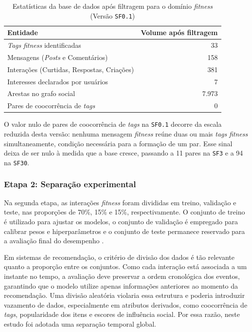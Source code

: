 \documentclass[a4paper,12pt]{article}
\begin{document}
{\begin{table}[H]
\centering
\caption{Estatísticas da base de dados após filtragem para o domínio \textit{fitness} (Versão \texttt{SF0.1})}
\label{tab:estatisticas_extracao}
\small
\begin{tabular}{|l|r|}
\hline
\textbf{Entidade} & \textbf{Volume após filtragem} \\
\hline
\textit{Tags} \textit{fitness} identificadas & 33 \\
Mensagens (\textit{Posts} e Comentários) & 158 \\
Interações (Curtidas, Respostas, Criações) & 381 \\
Interesses declarados por usuários & 7 \\
Arestas no grafo social & 7.973 \\
Pares de coocorrência de \textit{tags} & 0 \\
\hline
\end{tabular}
\end{table}

O valor nulo de pares de coocorrência de \textit{tags} na \texttt{SF0.1} decorre da escala reduzida desta versão: nenhuma mensagem \textit{fitness} reúne duas ou mais \textit{tags} \textit{fitness} simultaneamente, condição necessária para a formação de um par. Esse sinal deixa de ser nulo à medida que a base cresce, passando a 11 pares na \texttt{SF3} e a 94 na \texttt{SF30}.


\subsubsection{Etapa 2: Separação experimental}

Na segunda etapa, as interações \textit{fitness} foram divididas em treino, validação e teste, nas proporções de 70\%, 15\% e 15\%, respectivamente. O conjunto de treino é utilizado para ajustar os modelos, o conjunto de validação é empregado para calibrar pesos e hiperparâmetros e o conjunto de teste permanece reservado para a avaliação final do desempenho \cite{Goodfellow2016DeepLearning,Hastie2001Elements}.

Em sistemas de recomendação, o critério de divisão dos dados é tão relevante quanto a proporção entre os conjuntos. Como cada interação está associada a um instante no tempo, a avaliação deve preservar a ordem cronológica dos eventos, garantindo que o modelo utilize apenas informações anteriores ao momento da recomendação. Uma divisão aleatória violaria essa estrutura e poderia introduzir vazamento de dados, especialmente em atributos derivados, como coocorrência de \textit{tags}, popularidade dos itens e escores de influência social. Por essa razão, neste estudo foi adotada uma separação temporal global.

}
\end{document}
